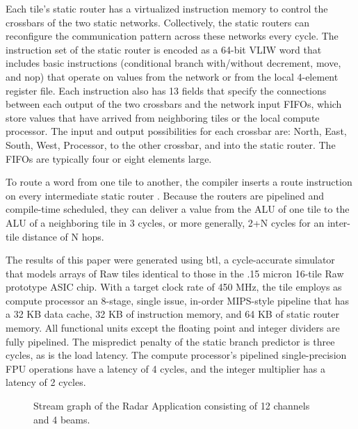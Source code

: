 Each tile's static router has a virtualized instruction memory to
control the crossbars of the two static networks. Collectively, the
static routers can reconfigure the communication pattern across these
networks every cycle.  The instruction set of the static router is
encoded as a 64-bit VLIW word that includes basic instructions
(conditional branch with/without decrement, move, and nop) that
operate on values from the network or from the local 4-element
register file. Each instruction also has 13 fields that specify the
connections between each output of the two crossbars and the network
input FIFOs, which store values that have arrived from neighboring
tiles or the local compute processor.  The input and output
possibilities for each crossbar are: North, East, South, West,
Processor, to the other crossbar, and into the static router. The
FIFOs are typically four or eight elements large.

To route a word from one tile to another, the compiler inserts a route
instruction on every intermediate static router \cite{lee98spacetime}.
Because the routers are pipelined and compile-time scheduled, they can
deliver a value from the ALU of one tile to the ALU of a neighboring
tile in 3 cycles, or more generally, 2+N cycles for an inter-tile
distance of N hops.

The results of this paper were generated using btl, a cycle-accurate
simulator that models arrays of Raw tiles identical to those in the
.15 micron 16-tile Raw prototype ASIC chip.  With a target clock rate
of 450 MHz, the tile employs as compute processor an 8-stage, single
issue, in-order MIPS-style pipeline that has a 32 KB data cache, 32 KB
of instruction memory, and 64 KB of static router memory. All
functional units except the floating point and integer dividers are
fully pipelined. The mispredict penalty of the static branch predictor
is three cycles, as is the load latency. The compute processor's
pipelined single-precision FPU operations have a latency of 4 cycles,
and the integer multiplier has a latency of 2 cycles.

\begin{figure}
\centering
{}
\caption{Stream graph of the Radar Application consisting of 12
channels and 4 beams. \label{fig:beam-graph}}
\end{figure}